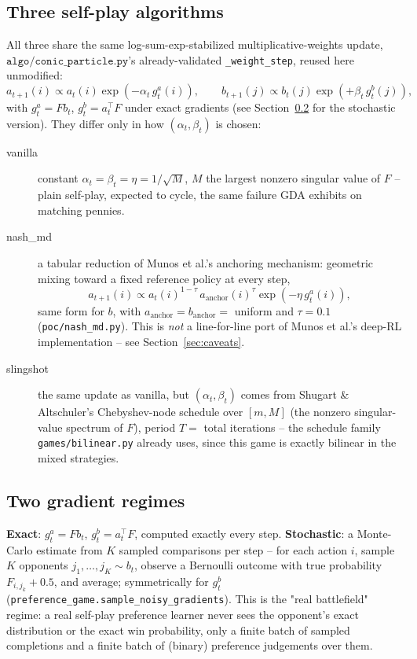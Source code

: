 \documentclass[11pt]{article}
\begin{document}
\subsection{Three self-play algorithms}
All three share the same log-sum-exp-stabilized multiplicative-weights
update, $\texttt{algo/conic\_particle.py}$'s already-validated
\texttt{\_weight\_step}, reused here unmodified:
\[
a_{t+1}(i) \propto a_t(i)\exp(-\alpha_t\, g^a_t(i)), \qquad
b_{t+1}(j) \propto b_t(j)\exp(+\beta_t\, g^b_t(j)),
\]
with $g^a_t = F b_t$, $g^b_t = a_t^\top F$ under exact gradients (see
Section~\ref{sec:noise} for the stochastic version). They differ only in
how $(\alpha_t, \beta_t)$ is chosen:
\begin{description}
  \item[vanilla] constant $\alpha_t=\beta_t=\eta=1/\sqrt{M}$, $M$ the
  largest nonzero singular value of $F$ -- plain self-play, expected to
  cycle, the same failure GDA exhibits on matching pennies.
  \item[nash\_md] a tabular reduction of Munos et al.'s anchoring mechanism:
  geometric mixing toward a fixed reference policy at every step,
  \[
  a_{t+1}(i) \propto a_t(i)^{1-\tau}\, a_{\text{anchor}}(i)^{\tau}
    \exp(-\eta\, g^a_t(i)),
  \]
  same form for $b$, with $a_{\text{anchor}}=b_{\text{anchor}}=$ uniform and
  $\tau=0.1$ (\texttt{poc/nash\_md.py}). This is \emph{not} a line-for-line
  port of Munos et al.'s deep-RL implementation -- see
  Section~\ref{sec:caveats}.
  \item[slingshot] the same update as vanilla, but $(\alpha_t,\beta_t)$
  comes from Shugart \& Altschuler's Chebyshev-node schedule over $[m, M]$
  (the nonzero singular-value spectrum of $F$), period $T=$ total
  iterations -- the schedule family \texttt{games/bilinear.py} already uses,
  since this game is exactly bilinear in the mixed strategies.
\end{description}

\subsection{Two gradient regimes}
\label{sec:noise}
\textbf{Exact}: $g^a_t = Fb_t$, $g^b_t=a_t^\top F$, computed exactly every
step. \textbf{Stochastic}: a Monte-Carlo estimate from $K$ sampled
comparisons per step -- for each action $i$, sample $K$ opponents
$j_1,\dots,j_K \sim b_t$, observe a Bernoulli outcome with true probability
$F_{i,j_k}+0.5$, and average; symmetrically for $g^b_t$
(\texttt{preference\_game.sample\_noisy\_gradients}). This is the "real
battlefield" regime: a real self-play preference learner never sees the
opponent's exact distribution or the exact win probability, only a finite
batch of sampled completions and a finite batch of (binary) preference
judgements over them.
\end{document}
